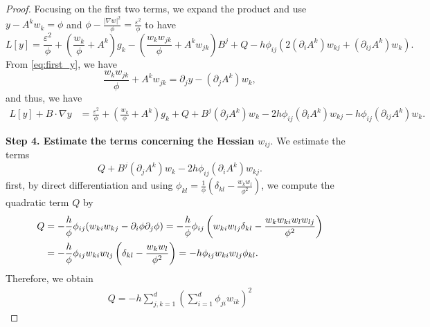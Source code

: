 \documentclass[11pt]{article}
\numberwithin{equation}{section}
\newcommand{\fix}[1]{\textcolor{red}{#1}}
\def\leq{\leqslant}
\begin{document}
\begin{proof}
Focusing on the first two terms, we expand the product and use $y - A^k w_k = \phi$ and $\phi - \frac{|\nabla w|^2}{\phi} = \frac{\varepsilon^2}{\phi}$ to have
\[
L[y] = \frac{\varepsilon^2}{\phi} + \left( \frac{w_k}{\phi} + A^k \right) g_k - \left( \frac{w_k w_{jk}}{\phi} + A^k w_{jk} \right) B^j + Q - h \phi_{ij} \left( 2 (\partial_i A^k) w_{kj} + (\partial_{ij} A^k) w_k \right).
\]
From \eqref{eq:first_y}, we have
\[
\frac{w_k w_{jk}}{\phi} + A^k w_{jk} = \partial_j y - (\partial_j A^k) w_k,
\]
and thus, we have
\begin{align}\label{eq:L-before-Q}
L[y] + B \cdot \nabla y &= \frac{\varepsilon^2}{\phi} + \left( \frac{w_k}{\phi} + A^k \right) g_k + Q  + B^j (\partial_j A^k) w_k - 2h\phi_{ij}(\partial_iA^k)w_{kj} - h \phi_{ij} (\partial_{ij} A^k) w_k.
\end{align}

\medskip

\textbf{Step 4. Estimate the terms concerning the Hessian $w_{ij}$}. We estimate the terms
\[
Q  + B^j (\partial_j A^k) w_k - 2h\phi_{ij}(\partial_iA^k)w_{kj}.
\]
first, by direct differentiation and using $\phi_{kl}=\frac{1}{\phi}\left(\delta_{kl} - \frac{w_kw_l}{\phi^2}\right)$, we compute the quadratic term $Q$ by
\begin{align*}
Q &= - \frac{h}{\phi} \phi_{ij} (w_{ki} w_{kj} - \partial_i \phi \partial_j \phi)  = - \frac{h}{\phi} \phi_{ij} \left(w_{ki} w_{lj}\delta_{kl} - \frac{w_kw_{ki}w_lw_{lj}}{\phi^2}\right) \notag \\
&= - \frac{h}{\phi} \phi_{ij} w_{ki} w_{lj}\left(\delta_{kl} - \frac{w_kw_l}{\phi^2}\right) = -h\phi_{ij} w_{ki} w_{lj}\phi_{kl}. \notag
\end{align*}
Therefore, we obtain
\begin{align}\label{eq:Q}
Q = -h\sum_{j,k=1}^d\left(\sum_{i=1}^d\phi_{ji}w_{ik}\right)^2
\end{align}




\end{proof}
\end{document}
